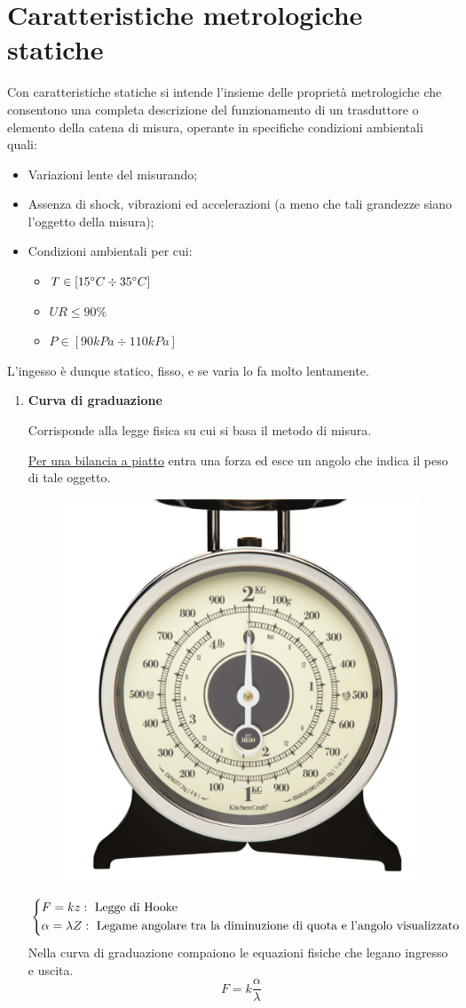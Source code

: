 \documentclass[a4paper, 15pt]{article}
\begin{document}
\section{Caratteristiche metrologiche statiche}  
\begin{adjustwidth}{2in}{}
	Con caratteristiche statiche si intende l'insieme delle proprietà metrologiche
	che consentono una completa descrizione del funzionamento di un
	trasduttore o elemento della catena di misura, operante in specifiche
	condizioni ambientali quali:
	\begin{itemize}
		\item Variazioni lente del misurando;
		\item Assenza di shock, vibrazioni ed accelerazioni (a meno che tali grandezze siano
		l'oggetto della misura);
		\item Condizioni ambientali per cui:
		\begin{itemize}
			\item $T\in[15\degree C \div 35\degree C]$
			\item $UR \le 90\%$
			\item $P\in[90kPa \div 110kPa]$
		\end{itemize}
	\end{itemize}
	L'ingesso è dunque statico, fisso, e se varia lo fa molto lentamente. 
	
\begin{enumerate}
\item \textbf{Curva di graduazione} 

	Corrisponde alla legge fisica su cui si basa il metodo di misura.  
	
	\underline{Per una bilancia a piatto} entra una forza ed esce un angolo che indica il peso di tale oggetto.	
\begin{figure}[H]
	\centering
	\includegraphics[width=0.3\linewidth]{fig/M22159844_3}
	\label{fig:m221598443}
\end{figure}
	\[ \begin{dcases}
		F = kz: ~ \text{Legge di Hooke} \\
		\alpha = \lambda Z: ~ \text{Legame angolare tra la diminuzione di quota e l'angolo visualizzato}
	\end{dcases}\]
	Nella curva di graduazione compaiono le equazioni fisiche che legano ingresso e uscita. 
	\[ F = k\dfrac{\alpha}{\lambda}\]
	

\end{enumerate}
\end{adjustwidth}
\end{document}
